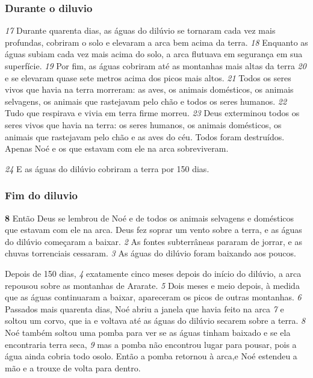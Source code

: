 \subsubsection*{Durante o diluvio}
\textit{\tiny 17}
 Durante quarenta dias, as águas do dilúvio se tornaram cada vez mais profundas, cobriram o solo e elevaram a arca bem acima da terra. 
\textit{\tiny 18}
 Enquanto as águas subiam cada vez mais acima do solo, a arca flutuava em segurança em sua superfície. 
\textit{\tiny 19}
 Por fim, as águas cobriram até as montanhas mais altas da terra 
\textit{\tiny 20}
 e se elevaram quase sete metros acima dos picos mais altos. 
\textit{\tiny 21}
 Todos os seres vivos que havia na terra morreram: as aves, os animais domésticos, os animais selvagens, os animais que rastejavam pelo chão e todos os seres humanos. 
\textit{\tiny 22}
 Tudo que respirava e vivia em terra firme morreu. 
\textit{\tiny 23}
 Deus exterminou todos os seres vivos que havia na terra: os seres humanos, os animais domésticos, os animais que rastejavam pelo chão e as aves do céu. Todos foram destruídos. Apenas Noé e os que estavam com ele na arca sobreviveram.



\bigskip
\textit{\tiny 24}
 E as águas do dilúvio cobriram a terra por 150 dias.



\bigskip
\subsubsection*{Fim do diluvio}
\textbf{\large 8}
 Então Deus se lembrou de Noé e de todos os animais selvagens e domésticos que estavam com ele na arca. Deus fez soprar um vento sobre a terra, e as águas do dilúvio começaram a baixar. 
\textit{\tiny 2}
 As fontes subterrâneas pararam de jorrar, e as chuvas torrenciais cessaram. 
\textit{\tiny 3}
 As águas do dilúvio foram baixando aos poucos.

\bigskip
Depois de 150 dias, 
\textit{\tiny 4}
 exatamente cinco meses depois do início do dilúvio, a arca repousou sobre as montanhas de Ararate. 
\textit{\tiny 5}
 Dois meses e meio depois, à medida que as águas continuaram a baixar, apareceram os picos de outras montanhas. 
\textit{\tiny 6}
 Passados mais quarenta dias, Noé abriu a janela que havia feito na arca 
\textit{\tiny 7}
 e soltou um corvo, que ia e voltava até as águas do dilúvio secarem sobre a terra. 
\textit{\tiny 8}
 Noé também soltou uma pomba para ver se as águas tinham baixado e se ela encontraria terra seca, 
\textit{\tiny 9}
 mas a pomba não encontrou lugar para pousar, pois a água ainda cobria todo osolo. Então a pomba retornou à arca,e Noé estendeu a mão e a trouxe de volta para dentro.


